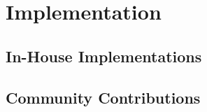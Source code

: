 \section{Implementation}

\subsection{In-House Implementations}

\subsection{Community Contributions}

